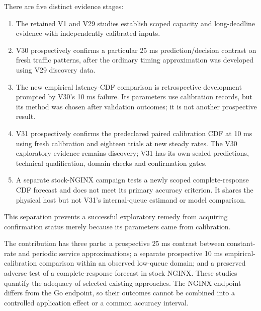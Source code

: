 \documentclass[11pt,a4paper]{article}
\begin{document}
There are five distinct evidence stages:

\begin{enumerate}
\item The retained V1 and V29 studies establish scoped capacity and long-deadline
evidence with independently calibrated inputs.
\item V30 prospectively confirms a particular 25 ms prediction/decision contrast
on fresh traffic patterns, after the ordinary timing approximation was
developed using V29 discovery data.
\item The new empirical latency-CDF comparison is retrospective development
prompted by V30's 10 ms failure. Its parameters use calibration records,
but its method was chosen after validation outcomes; it is not another
prospective result.
\item V31 prospectively confirms the predeclared paired calibration CDF at 10 ms
using fresh calibration and eighteen trials at new steady rates. The V30
exploratory evidence remains discovery; V31 has its own sealed predictions,
technical qualification, domain checks and confirmation gates.
\item A separate stock-NGINX campaign tests a newly scoped complete-response CDF
forecast and does not meet its primary accuracy criterion. It shares the
physical host but not V31's internal-queue estimand or model comparison.
\end{enumerate}
This separation prevents a successful exploratory remedy from acquiring
confirmation status merely because its parameters came from calibration.

The contribution has three parts: a prospective 25 ms contrast between
constant-rate and periodic service approximations; a separate prospective
10 ms empirical-calibration comparison within an observed low-queue domain;
and a preserved adverse test of a complete-response forecast in stock NGINX.
These studies quantify the adequacy of selected existing approaches. The
NGINX endpoint differs from the Go endpoint, so their outcomes cannot be
combined into a controlled application effect or a common accuracy interval.
\end{document}
